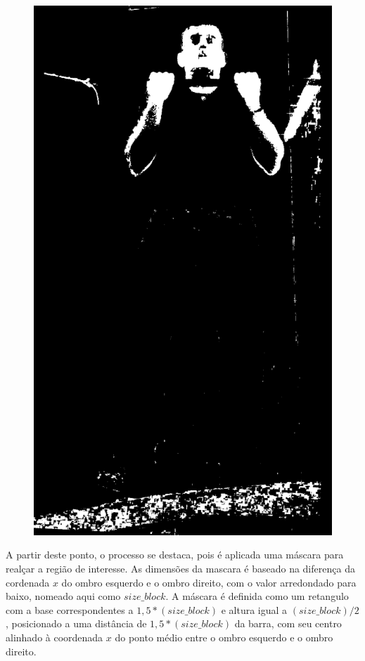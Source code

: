 \begin{figure}[H]
\begin{minipage}{\sizeImg\textwidth}
            \includegraphics[width=\textwidth]{figuras/ultrapassar_barra/134_limited.png}
        \end{minipage}
    \label{fig:bin_ultrapassar_barra}
\end{figure}
\renewcommand{\sizeImg}{0.4}


 A partir deste ponto, o processo se destaca, pois é aplicada uma máscara para realçar a região de interesse. As dimensões da mascara é baseado na diferença da cordenada $x$ do ombro esquerdo e o ombro direito, com o valor arredondado para baixo, nomeado aqui como $size\_block$. A máscara é definida como um retangulo com a base correspondentes a  $1,5*(size\_block)$ e altura igual a  $(size\_block)/2$, posicionado a uma distância de  $1,5*(size\_block)$ da barra, com seu centro alinhado à coordenada $x$ do ponto médio entre o ombro esquerdo e o ombro direito.
 
